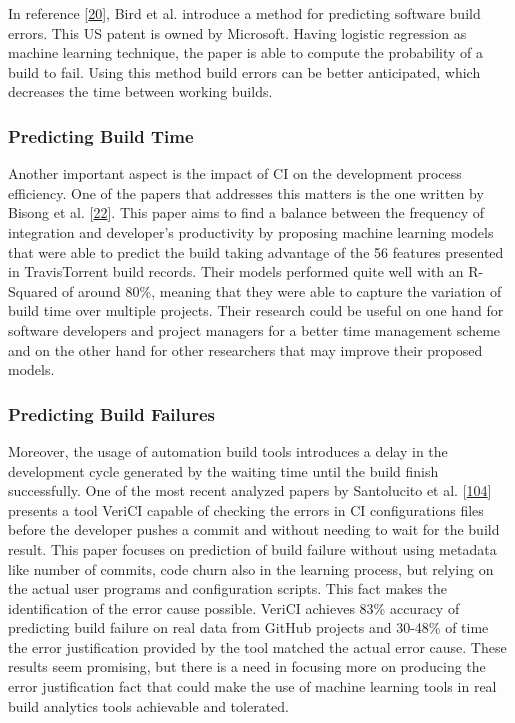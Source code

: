 \documentclass[]{book}
\begin{document}
In reference {[}\protect\hyperlink{ref-bird2017predicting}{20}{]}, Bird
et al. introduce a method for predicting software build errors. This US
patent is owned by Microsoft. Having logistic regression as machine
learning technique, the paper is able to compute the probability of a
build to fail. Using this method build errors can be better anticipated,
which decreases the time between working builds.

\subsubsection{Predicting Build Time}\label{predicting-build-time}

Another important aspect is the impact of CI on the development process
efficiency. One of the papers that addresses this matters is the one
written by Bisong et al.
{[}\protect\hyperlink{ref-bisong2017built}{22}{]}. This paper aims to
find a balance between the frequency of integration and developer's
productivity by proposing machine learning models that were able to
predict the build taking advantage of the 56 features presented in
TravisTorrent build records. Their models performed quite well with an
R-Squared of around 80\%, meaning that they were able to capture the
variation of build time over multiple projects. Their research could be
useful on one hand for software developers and project managers for a
better time management scheme and on the other hand for other
researchers that may improve their proposed models.

\subsubsection{Predicting Build
Failures}\label{predicting-build-failures}

Moreover, the usage of automation build tools introduces a delay in the
development cycle generated by the waiting time until the build finish
successfully. One of the most recent analyzed papers by Santolucito et
al. {[}\protect\hyperlink{ref-santolucito2018statically}{104}{]}
presents a tool VeriCI capable of checking the errors in CI
configurations files before the developer pushes a commit and without
needing to wait for the build result. This paper focuses on prediction
of build failure without using metadata like number of commits, code
churn also in the learning process, but relying on the actual user
programs and configuration scripts. This fact makes the identification
of the error cause possible. VeriCI achieves 83\% accuracy of predicting
build failure on real data from GitHub projects and 30-48\% of time the
error justification provided by the tool matched the actual error cause.
These results seem promising, but there is a need in focusing more on
producing the error justification fact that could make the use of
machine learning tools in real build analytics tools achievable and
tolerated.
\end{document}
